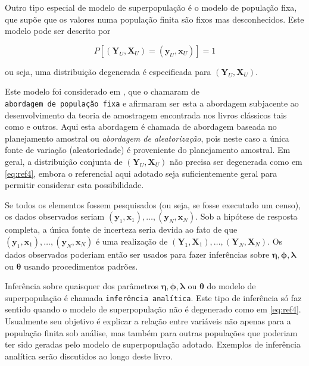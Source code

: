 \documentclass[]{book}
\theoremstyle{definition}
\theoremstyle{definition}
\theoremstyle{definition}
\theoremstyle{remark}
\begin{document}
Outro tipo especial de modelo de superpopulação é o modelo de população
fixa, que supõe que os valores numa população finita são fixos mas
desconhecidos. Este modelo pode ser descrito por

\begin{equation}
P\left[ \left( \mathbf{Y}_U , \mathbf{X}_U \right) = \left( \mathbf{y}_U , \mathbf{x}_U \right) \right] = 1 \label{eq:ref4}
\end{equation}

ou seja, uma distribuição degenerada é especificada para
\(\left(\mathbf{Y}_U , \mathbf{X}_U \right)\).

Este modelo foi considerado em \citep{cassel}, que o chamaram de
\texttt{abordagem\ de\ população\ fixa} e afirmaram ser esta a abordagem
subjacente ao desenvolvimento da teoria de amostragem encontrada nos
livros clássicos tais como \citep{cochran} e outros. Aqui esta abordagem
é chamada de abordagem baseada no planejamento amostral ou
\emph{abordagem de aleatorização}, pois neste caso a única fonte de
variação (aleatoriedade) é proveniente do planejamento amostral. Em
geral, a distribuição conjunta de
\(\left( \mathbf{Y}_U , \mathbf{X}_U \right)\) não precisa ser
degenerada como em \eqref{eq:ref4}, embora o referencial aqui adotado seja
suficientemente geral para permitir considerar esta possibilidade.

Se todos os elementos fossem pesquisados (ou seja, se fosse executado um
censo), os dados observados seriam
\((\mathbf{y}_1 , \mathbf{x}_1) ,\ldots, (\mathbf{y}_N , \mathbf{x}_N)\).
Sob a hipótese de resposta completa, a única fonte de incerteza seria
devida ao fato de que
\((\mathbf{y}_1 , \mathbf{x}_1) ,\ldots, (\mathbf{y}_N , \mathbf{x}_N)\)
é uma realização de
\(\left( \mathbf{Y}_1 , \mathbf{X}_1 \right) ,\ldots, \left( \mathbf{Y}_N , \mathbf{X}_N \right)\).
Os dados observados poderiam então ser usados para fazer inferências
sobre \(\mathbf{\eta}, \mathbf{\phi},\mathbf{\lambda}\) ou
\(\mathbf{\theta}\) usando procedimentos padrões.

Inferência sobre quaisquer dos parâmetros
\(\mathbf{\eta},\mathbf{\phi},\mathbf{\lambda}\) ou \(\mathbf{\theta}\)
do modelo de superpopulação é chamada \texttt{inferência\ analítica}.
Este tipo de inferência só faz sentido quando o modelo de superpopulação
não é degenerado como em \eqref{eq:ref4}. Usualmente seu objetivo é
explicar a relação entre variáveis não apenas para a população finita
sob análise, mas também para outras populações que poderiam ter sido
geradas pelo modelo de superpopulação adotado. Exemplos de inferência
analítica serão discutidos ao longo deste livro.
\end{document}
